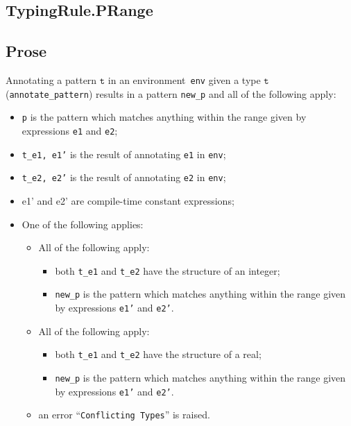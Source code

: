 \documentclass{book}
\newcommand\vt[0]{\texttt{t}}
\begin{document}
\begin{itemize}

\section{TypingRule.PRange \label{sec:TypingRule.PRange}}

    \subsection{Prose}
   Annotating a pattern $\vt$ in an environment~\texttt{env} given a type $\vt$ (\texttt{annotate\_pattern}) results in a pattern \texttt{new\_p} and all of the following apply:
   \begin{itemize}
   \item \texttt{p} is the pattern which matches anything within the range given by
      expressions \texttt{e1} and \texttt{e2};
   \item \texttt{t\_e1, e1'} is the result of annotating \texttt{e1} in \texttt{env};
   \item \texttt{t\_e2, e2'} is the result of annotating \texttt{e2} in \texttt{env};
   \item e1' and e2' are compile-time constant expressions;
   \item One of the following applies:
     \begin{itemize}
     \item All of the following apply:
           \begin{itemize}
           \item both \texttt{t\_e1} and \texttt{t\_e2} have the structure of an integer;
           \item \texttt{new\_p} is the pattern which matches anything within the range given by
      expressions \texttt{e1'} and \texttt{e2'}.
           \end{itemize}
     \item All of the following apply:
           \begin{itemize}
           \item both \texttt{t\_e1} and \texttt{t\_e2} have the structure of a real;
           \item \texttt{new\_p} is the pattern which matches anything within the range given by
      expressions \texttt{e1'} and \texttt{e2'}.
           \end{itemize}
     \item an error ``\texttt{Conflicting Types}'' is raised.
     \end{itemize}
   \end{itemize}


\end{itemize}
\end{document}

